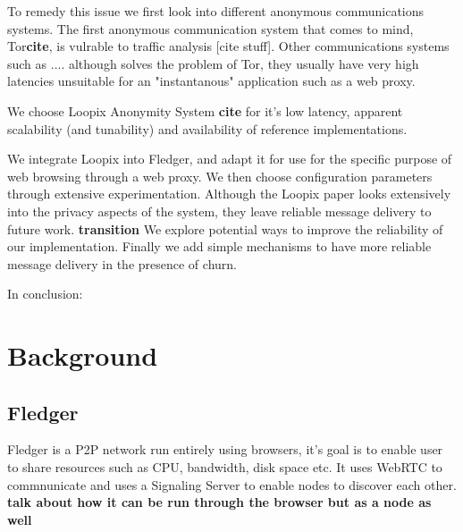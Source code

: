 \documentclass[a4paper,11pt,oneside]{report}
\begin{document}
To remedy this issue we first look into different anonymous communications systems. The first anonymous communication system that comes to mind, Tor\textbf{cite}, is vulrable to traffic analysis [cite stuff].
Other communications systems such as .... although solves the problem of Tor, they usually have very high latencies unsuitable for an "instantanous" application such as a web proxy.

We choose Loopix Anonymity System \textbf{cite} for it's low latency, apparent scalability (and tunability) and availability of reference implementations.

We integrate Loopix into Fledger, and adapt it for use for the specific purpose of web browsing through a web proxy. We then choose configuration parameters through extensive experimentation. Although the Loopix paper looks extensively into the privacy aspects of the system, they leave reliable message delivery to future work. \textbf{transition} We explore potential ways to improve the reliability of our implementation. Finally we add simple mechanisms to have more reliable message delivery in the presence of churn.

In conclusion:


\chapter{Background}



\section{Fledger}
Fledger is a P2P network run entirely using browsers, it's goal is to enable user to share resources such as CPU, bandwidth, disk space etc. It uses WebRTC to commnunicate and uses a Signaling Server to enable nodes to discover each other.
\textbf{talk about how it can be run through the browser but as a node as well}
\end{document}
